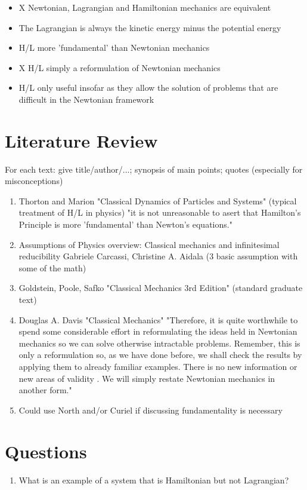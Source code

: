 \documentclass{article}
\begin{document}
\begin{itemize}
	\item X Newtonian, Lagrangian and Hamiltonian mechanics are equivalent
	\item The Lagrangian is always the kinetic energy minus the potential energy 
	\item H/L more 'fundamental' than Newtonian mechanics
	\item X H/L simply a reformulation of Newtonian mechanics
	\item H/L only useful insofar as they allow the solution of problems that are difficult in the Newtonian framework
\end{itemize}

\section{Literature Review}
For each text: give title/author/...; synopsis of main points; quotes (especially for misconceptions)

\begin{enumerate}
\item Thorton and Marion "Classical Dynamics of Particles and Systems"
(typical treatment of H/L in physics)
"it is not unreasonable to asert that Hamilton's Principle is more 'fundamental' than Newton's equations."
\item Assumptions of Physics overview:
Classical mechanics and infinitesimal reducibility
Gabriele Carcassi, Christine A. Aidala (3 basic assumption with some of the math)
\item Goldstein, Poole, Safko "Classical Mechanics 3rd Edition"
(standard graduate text)
\item Douglas A. Davis "Classical Mechanics"
"Therefore, it is quite worthwhile to spend some considerable effort in reformulating the ideas held in Newtonian mechanics so we can solve otherwise intractable problems. Remember, this is only a reformulation so, as we have done before, we shall check the results by applying them to already familiar examples. There is no new information or new areas of validity . We will simply restate Newtonian mechanics in another form."
\item Could use North and/or Curiel if discussing fundamentality is necessary

\end{enumerate}
\section{Questions}
\begin{enumerate}
\item What is an example of a system that is Hamiltonian but not Lagrangian?
\end{enumerate}
\end{document}
